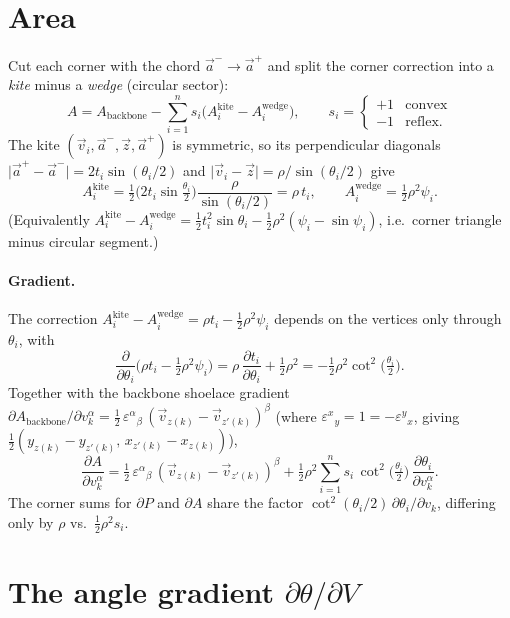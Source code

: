 \documentclass[11pt]{article}
\newcommand{\half}{\tfrac{1}{2}}
\newcommand{\dd}[2]{\frac{\partial #1}{\partial #2}}
\begin{document}
\section{Area}

Cut each corner with the chord $\vec a^-\!\to\vec a^+$ and split the corner correction into a
\emph{kite} minus a \emph{wedge} (circular sector):
\[
  A = A_{\text{backbone}} - \sum_{i=1}^{n} s_i\big(A^{\text{kite}}_i - A^{\text{wedge}}_i\big),
  \qquad
  s_i = \begin{cases}+1 & \text{convex}\\ -1 & \text{reflex.}\end{cases}
\]
The kite $(\vec v_i,\vec a^-,\vec z,\vec a^+)$ is symmetric, so its perpendicular diagonals
$\lvert\vec a^+-\vec a^-\rvert = 2t_i\sin(\theta_i/2)$ and
$\lvert\vec v_i-\vec z\rvert = \rho/\sin(\theta_i/2)$ give
\[
  A^{\text{kite}}_i = \tfrac12\big(2t_i\sin\tfrac{\theta_i}{2}\big)\frac{\rho}{\sin(\theta_i/2)}
  = \rho\,t_i,
  \qquad
  A^{\text{wedge}}_i = \half\rho^2\psi_i .
\]
(Equivalently $A^{\text{kite}}_i - A^{\text{wedge}}_i = \half t_i^2\sin\theta_i - \half\rho^2(\psi_i-\sin\psi_i)$,
i.e.\ corner triangle minus circular segment.)

\paragraph{Gradient.}
The correction $A^{\text{kite}}_i - A^{\text{wedge}}_i = \rho t_i - \half\rho^2\psi_i$ depends on
the vertices only through $\theta_i$, with
\[
  \dd{}{\theta_i}\!\Big(\rho t_i - \half\rho^2\psi_i\Big)
  = \rho\,\dd{t_i}{\theta_i} + \half\rho^2
  = -\half\rho^2\cot^2\!\Big(\tfrac{\theta_i}{2}\Big).
\]
Together with the backbone shoelace gradient
$\partial A_{\text{backbone}}/\partial v_k^\alpha
 = \half\,\varepsilon^{\alpha}{}_{\beta}\,(\vec v_{z(k)}-\vec v_{z'(k)})^{\beta}$
(where $\varepsilon^{x}{}_{y}=1=-\varepsilon^{y}{}_{x}$, giving $\half(y_{z(k)}-y_{z'(k)},\,x_{z'(k)}-x_{z(k)})$),
\[
  \boxed{\;
  \dd{A}{v_k^\alpha}
  = \half\,\varepsilon^{\alpha}{}_{\beta}\,(\vec v_{z(k)}-\vec v_{z'(k)})^{\beta}
    + \half\rho^2\sum_{i=1}^{n} s_i\,\cot^2\!\Big(\tfrac{\theta_i}{2}\Big)\,\dd{\theta_i}{v_k^\alpha}.
  \;}
\]
The corner sums for $\partial P$ and $\partial A$ share the factor
$\cot^2(\theta_i/2)\,\partial\theta_i/\partial v_k$, differing only by $\rho$ vs.\ $\half\rho^2 s_i$.

\section{The angle gradient $\partial\theta/\partial V$}
\end{document}

